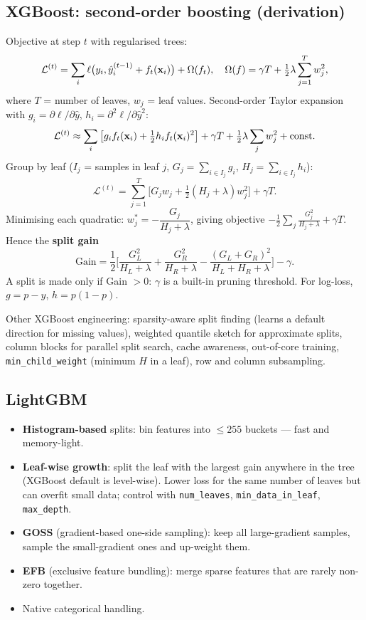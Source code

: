 \subsection{XGBoost: second-order boosting (derivation)}
Objective at step $t$ with regularised trees:
\[\mathcal{L}^{(t)}=\sum_i\ell\big(y_i,\hat y_i^{(t-1)}+f_t(\mathbf{x}_i)\big)+\Omega(f_t),\quad\Omega(f)=\gamma T+\tfrac12\lambda\sum_{j=1}^Tw_j^2,\]
where $T$ = number of leaves, $w_j$ = leaf values. Second-order Taylor expansion with $g_i=\partial\ell/\partial\hat y$, $h_i=\partial^2\ell/\partial\hat y^2$:
\[\mathcal{L}^{(t)}\approx\sum_i\big[g_if_t(\mathbf{x}_i)+\tfrac12h_if_t(\mathbf{x}_i)^2\big]+\gamma T+\tfrac12\lambda\sum_jw_j^2+\text{const}.\]
Group by leaf ($I_j$ = samples in leaf $j$, $G_j=\sum_{i\in I_j}g_i$, $H_j=\sum_{i\in I_j}h_i$):
\[\mathcal{L}^{(t)}=\sum_{j=1}^T\big[G_jw_j+\tfrac12(H_j+\lambda)w_j^2\big]+\gamma T.\]
Minimising each quadratic: $w_j^*=-\dfrac{G_j}{H_j+\lambda}$, giving objective $-\frac12\sum_j\frac{G_j^2}{H_j+\lambda}+\gamma T$. Hence the \textbf{split gain}
\[\text{Gain}=\frac12\Big[\frac{G_L^2}{H_L+\lambda}+\frac{G_R^2}{H_R+\lambda}-\frac{(G_L+G_R)^2}{H_L+H_R+\lambda}\Big]-\gamma.\]
A split is made only if Gain $>0$: $\gamma$ is a built-in pruning threshold. For log-loss, $g=p-y$, $h=p(1-p)$.

Other XGBoost engineering: sparsity-aware split finding (learns a default direction for missing values), weighted quantile sketch for approximate splits, column blocks for parallel split search, cache awareness, out-of-core training, \texttt{min\_child\_weight} (minimum $H$ in a leaf), row and column subsampling.

\subsection{LightGBM}
\begin{itemize}
  \item \textbf{Histogram-based} splits: bin features into $\le255$ buckets --- fast and memory-light.
  \item \textbf{Leaf-wise growth}: split the leaf with the largest gain anywhere in the tree (XGBoost default is level-wise). Lower loss for the same number of leaves but can overfit small data; control with \texttt{num\_leaves}, \texttt{min\_data\_in\_leaf}, \texttt{max\_depth}.
  \item \textbf{GOSS} (gradient-based one-side sampling): keep all large-gradient samples, sample the small-gradient ones and up-weight them.
  \item \textbf{EFB} (exclusive feature bundling): merge sparse features that are rarely non-zero together.
  \item Native categorical handling.
\end{itemize}

